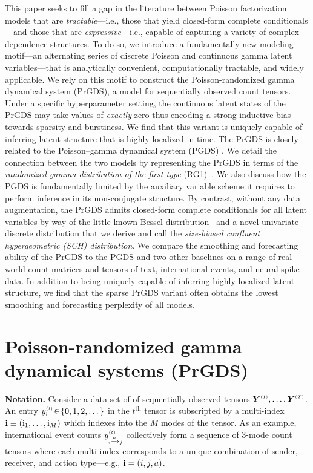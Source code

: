 \documentclass{article}
\begin{document}
This paper seeks to fill a gap in the literature between Poisson factorization models that are \emph{tractable}---i.e., those that yield closed-form complete conditionals---and those that are \emph{expressive}---i.e., capable of capturing a variety of complex dependence structures. To do so, we introduce a fundamentally new modeling motif---an alternating series of discrete Poisson and continuous gamma latent variables---that is analytically convenient, computationally tractable, and widely applicable. We rely on this motif to construct the Poisson-randomized gamma dynamical system (PrGDS), a model for sequentially observed count tensors. Under a specific hyperparameter setting, the continuous latent states of the PrGDS may take values of \emph{exactly} zero thus encoding a strong inductive bias towards sparsity and burstiness. We find that this variant is uniquely capable of inferring latent structure that is highly localized in time. The PrGDS is closely related to the Poisson--gamma dynamical system (PGDS) \cite{schein2016poisson}. We detail the connection between the two models by representing the PrGDS in terms of the \emph{randomized gamma distribution of the first type} (RG1)~\cite{yuan2000bessel,makarov2010exact}. We also discuss how the PGDS is fundamentally limited by the auxiliary variable scheme it requires to perform inference in its non-conjugate structure. By contrast, without any data augmentation, the PrGDS admits closed-form complete conditionals for all latent variables by way of the little-known Bessel distribution~\cite{yuan2000bessel} and a novel univariate discrete distribution that we derive and call the \emph{size-biased confluent hypergeometric (SCH) distribution}. We compare the smoothing and forecasting ability of the PrGDS to the PGDS and two other baselines on a range of real-world count matrices and tensors of text, international events, and neural spike data. In addition to being uniquely capable of inferring highly localized latent structure, we find that the sparse PrGDS variant often obtains the lowest smoothing and forecasting perplexity of all models.~

\section{Poisson-randomized gamma dynamical systems (PrGDS)}
\label{sec:prgds}

\textbf{Notation.} Consider a data set of of sequentially observed tensors $\boldsymbol{Y}^{\mathsmaller{(1)}},\dots,\boldsymbol{Y}^{\mathsmaller{(T)}}$. An entry $\ydt \!\in\! \{0,1,2,\dots\}$ in the $t^{\textrm{th}}$ tensor is subscripted by a multi-index $\textbf{\textrm{i}} \equiv (\textrm{i}_1,\dots,\textrm{i}_M)$ which indexes into the $M$ modes of the tensor. As an example, international event counts $y^{\mathsmaller{(t)}}_{\mathsmaller{i \xrightarrow{a} j}}$ collectively form a sequence of 3-mode count tensors where each multi-index corresponds to a unique combination of sender, receiver, and action type---e.g., $\textbf{\textrm{i}} = (i, j, a)$.
\end{document}
